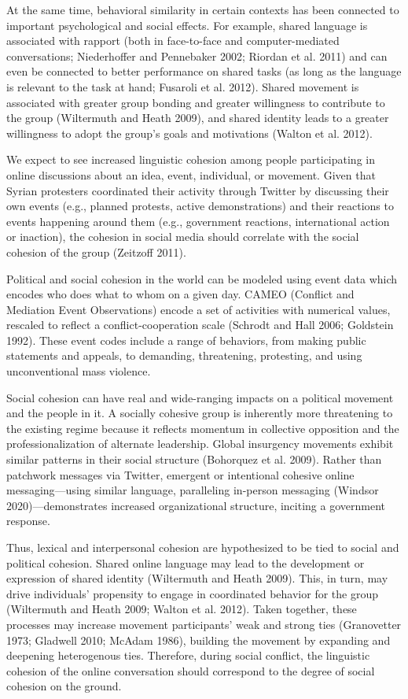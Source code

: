 \documentclass[
  english,
  man]{apa6}
\begin{document}
At the same time, behavioral similarity in certain contexts has been
connected to important psychological and social effects. For example, shared
language is associated with rapport (both in face-to-face and computer-mediated
conversations; Niederhoffer and Pennebaker 2002; Riordan et al. 2011) and
can even be connected to better performance on shared tasks (as long as
the language is relevant to the task at hand; Fusaroli et al. 2012). Shared
movement is associated with greater group bonding and greater willingness
to contribute to the group (Wiltermuth and Heath 2009), and shared identity
leads to a greater willingness to adopt the group's goals and
motivations (Walton et al. 2012).

We expect to see increased linguistic cohesion among people participating in
online discussions about an idea, event, individual, or movement. Given that
Syrian protesters coordinated their activity through Twitter by discussing their
own events (e.g., planned protests, active demonstrations) and their reactions
to events happening around them (e.g., government reactions, international
action or inaction), the cohesion in social media should correlate with the
social cohesion of the group (Zeitzoff 2011).

Political and social cohesion in the world can be modeled using event data which
encodes who does what to whom on a given day. CAMEO (Conflict and Mediation
Event Observations) encode a set of activities with numerical values, rescaled
to reflect a conflict-cooperation scale (Schrodt and Hall 2006; Goldstein 1992). These event codes include a range of behaviors, from
making public statements and appeals, to demanding, threatening, protesting, and
using unconventional mass violence.

Social cohesion can have real and wide-ranging impacts on a political movement
and the people in it. A socially cohesive group is inherently more threatening
to the existing regime because it reflects momentum in collective opposition and
the professionalization of alternate leadership. Global insurgency movements
exhibit similar patterns in their social structure (Bohorquez et al. 2009).
Rather than patchwork messages via Twitter, emergent or intentional cohesive
online messaging---using similar language, paralleling in-person messaging
(Windsor 2020)---demonstrates increased organizational structure, inciting a
government response.

Thus, lexical and interpersonal cohesion are hypothesized to be tied to social
and political cohesion. Shared online language may lead to the development or
expression of shared identity (Wiltermuth and Heath 2009). This, in turn, may
drive individuals' propensity to engage in coordinated behavior for the group
(Wiltermuth and Heath 2009; Walton et al. 2012). Taken together, these processes may
increase movement participants' weak and strong ties (Granovetter 1973; Gladwell 2010; McAdam 1986), building the movement by expanding and deepening
heterogenous ties. Therefore, during social conflict, the linguistic cohesion
of the online conversation should correspond to the degree of social cohesion on
the ground.
\end{document}
